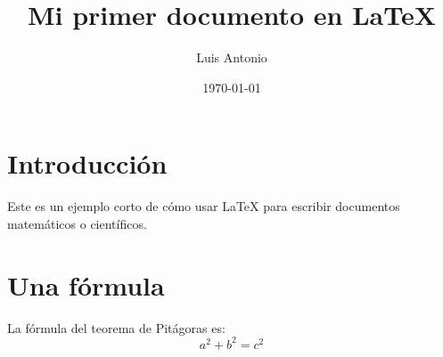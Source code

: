 \documentclass{article}
\title{Mi primer documento en \LaTeX}
\author{Luis Antonio}
\date{\today}
\begin{document}
\maketitle

\section{Introducción}
Este es un ejemplo corto de cómo usar \LaTeX{} para escribir documentos matemáticos o científicos.

\section{Una fórmula}
La fórmula del teorema de Pitágoras es:
\[
a^2 + b^2 = c^2
\]
\end{document}
